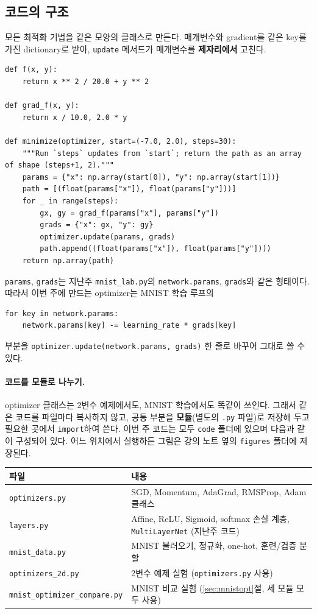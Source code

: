 \documentclass[11pt,a4paper]{article}
\begin{document}
\subsection{코드의 구조}

모든 최적화 기법을 같은 모양의 클래스로 만든다.
매개변수와 gradient를 같은 key를 가진 dictionary로 받아, \texttt{update} 메서드가 매개변수를 \textbf{제자리에서} 고친다.

\begin{lstlisting}
def f(x, y):
    return x ** 2 / 20.0 + y ** 2

def grad_f(x, y):
    return x / 10.0, 2.0 * y

def minimize(optimizer, start=(-7.0, 2.0), steps=30):
    """Run `steps` updates from `start`; return the path as an array of shape (steps+1, 2)."""
    params = {"x": np.array(start[0]), "y": np.array(start[1])}
    path = [(float(params["x"]), float(params["y"]))]
    for _ in range(steps):
        gx, gy = grad_f(params["x"], params["y"])
        grads = {"x": gx, "y": gy}
        optimizer.update(params, grads)
        path.append((float(params["x"]), float(params["y"])))
    return np.array(path)
\end{lstlisting}

\texttt{params}, \texttt{grads}는 지난주 \texttt{mnist\_lab.py}의 \texttt{network.params}, \texttt{grads}와 같은 형태이다.
따라서 이번 주에 만드는 optimizer는 MNIST 학습 루프의
\begin{lstlisting}
for key in network.params:
    network.params[key] -= learning_rate * grads[key]
\end{lstlisting}
부분을 \texttt{optimizer.update(network.params, grads)} 한 줄로 바꾸어 그대로 쓸 수 있다.

\paragraph{코드를 모듈로 나누기.}
optimizer 클래스는 2변수 예제에서도, MNIST 학습에서도 똑같이 쓰인다.
그래서 같은 코드를 파일마다 복사하지 않고, 공통 부분을 \textbf{모듈}(별도의 \texttt{.py} 파일)로 저장해 두고
필요한 곳에서 \texttt{import}하여 쓴다.
이번 주 코드는 모두 \texttt{code} 폴더에 있으며 다음과 같이 구성되어 있다.
어느 위치에서 실행하든 그림은 강의 노트 옆의 \texttt{figures} 폴더에 저장된다.

\begin{center}
\begin{tabular}{@{}lp{}@{}}
\toprule
파일 & 내용 \\
\midrule
\texttt{optimizers.py} & SGD, Momentum, AdaGrad, RMSProp, Adam 클래스 \\
\texttt{layers.py} & Affine, ReLU, Sigmoid, softmax 손실 계층, \texttt{MultiLayerNet} (지난주 코드) \\
\texttt{mnist\_data.py} & MNIST 불러오기, 정규화, one-hot, 훈련/검증 분할 \\
\midrule
\texttt{optimizers\_2d.py} & 2변수 예제 실험 (\texttt{optimizers.py} 사용) \\
\texttt{mnist\_optimizer\_compare.py} & MNIST 비교 실험 (\ref{sec:mnistopt}절, 세 모듈 모두 사용) \\
\bottomrule
\end{tabular}
\end{center}
\end{document}
